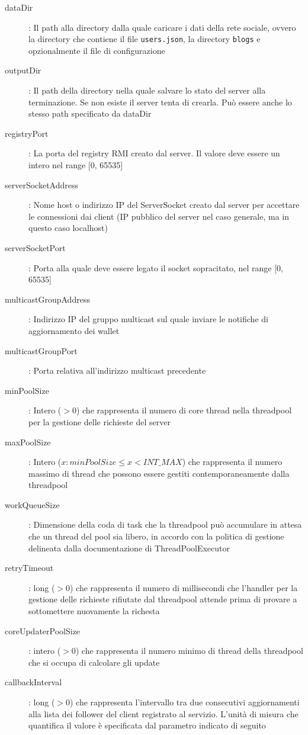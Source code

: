 \begin{description}
	\item[dataDir]: Il path alla directory dalla quale caricare i dati della rete sociale, ovvero la directory che contiene il file \verb|users.json|, la directory \verb|blogs| e opzionalmente il file di configurazione
	\item[outputDir]: Il path della directory nella quale salvare lo stato del server alla terminazione. Se non esiste il server tenta di crearla. Può essere anche lo stesso path
	specificato da dataDir
	\item[registryPort]: La porta del registry RMI creato dal server. Il valore deve essere un intero nel range [0, 65535]
	\item[serverSocketAddress]: Nome host o indirizzo IP del ServerSocket creato dal server per accettare le connessioni dai client (IP pubblico del server nel caso generale, ma in questo caso localhost)
	\item[serverSocketPort]: Porta alla quale deve essere legato il socket sopracitato, nel range [0, 65535]
	\item[multicastGroupAddress]: Indirizzo IP del gruppo multicast sul quale inviare le notifiche di aggiornamento dei wallet
	\item[multicastGroupPort]: Porta relativa all'indirizzo multicast precedente
	\item[minPoolSize]: Intero ($>0$) che rappresenta il numero di core thread nella threadpool per la gestione delle richieste del server
	\item[maxPoolSize]: Intero ($x : minPoolSize \le x < INT\_MAX$) che rappresenta il numero massimo di thread che possono essere gestiti contemporaneamente dalla threadpool
	\item[workQueueSize]: Dimensione della coda di task che la threadpool può accumulare in attesa che un thread del pool sia libero, in accordo con la politica di gestione delineata dalla documentazione di ThreadPoolExecutor
	\item[retryTimeout]: long ($>0$) che rappresenta il numero di millisecondi che l'handler per la gestione delle richieste rifiutate dal threadpool attende prima di provare a sottomettere nuovamente la richesta
	\item[coreUpdaterPoolSize]: intero ($>0$) che rappresenta il numero minimo di thread della threadpool che si occupa di calcolare gli update
	\item[callbackInterval]: long ($>0$) che rappresenta l'intervallo tra due consecutivi aggiornamenti alla lista dei follower del client registrato al servizio. L'unità di misura che quantifica il valore è specificata dal parametro indicato di seguito

\end{description}
